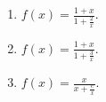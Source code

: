\begin{multicols}{2}
\begin{enumerate}[ref={\fcProblemRef}]
\item $\displaystyle f(x)=\frac{1+x }{1+\frac{2}x}$. 

\item $\displaystyle f(x)=\frac{1+x }{1+\frac{3}x}$. 

\item $\displaystyle f(x)=\frac{x}{x+\frac{c}{x}}$.

\end{enumerate}
\end{multicols}
